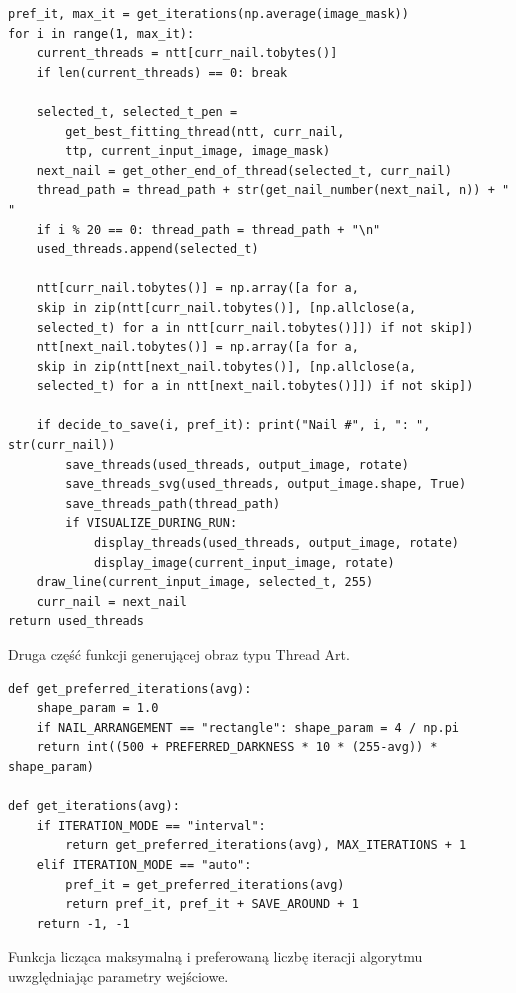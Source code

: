         \begin{code}[H]
        \begin{verbatim}
pref_it, max_it = get_iterations(np.average(image_mask))
for i in range(1, max_it):
    current_threads = ntt[curr_nail.tobytes()]
    if len(current_threads) == 0: break 

    selected_t, selected_t_pen =
        get_best_fitting_thread(ntt, curr_nail, 
        ttp, current_input_image, image_mask)
    next_nail = get_other_end_of_thread(selected_t, curr_nail)
    thread_path = thread_path + str(get_nail_number(next_nail, n)) + " "
    if i % 20 == 0: thread_path = thread_path + "\n"
    used_threads.append(selected_t)

    ntt[curr_nail.tobytes()] = np.array([a for a, 
    skip in zip(ntt[curr_nail.tobytes()], [np.allclose(a, 
    selected_t) for a in ntt[curr_nail.tobytes()]]) if not skip])
    ntt[next_nail.tobytes()] = np.array([a for a, 
    skip in zip(ntt[next_nail.tobytes()], [np.allclose(a, 
    selected_t) for a in ntt[next_nail.tobytes()]]) if not skip])
    
    if decide_to_save(i, pref_it): print("Nail #", i, ": ", str(curr_nail))
        save_threads(used_threads, output_image, rotate)
        save_threads_svg(used_threads, output_image.shape, True)
        save_threads_path(thread_path)
        if VISUALIZE_DURING_RUN:
            display_threads(used_threads, output_image, rotate)
            display_image(current_input_image, rotate)
    draw_line(current_input_image, selected_t, 255)
    curr_nail = next_nail
return used_threads
        \end{verbatim}
        \caption{Druga część funkcji generującej obraz typu Thread Art.}
        \label{imp-art-algorithm-loop-code}
        \end{code}
        

        \begin{code}[H]
        \begin{verbatim}
def get_preferred_iterations(avg):
    shape_param = 1.0
    if NAIL_ARRANGEMENT == "rectangle": shape_param = 4 / np.pi
    return int((500 + PREFERRED_DARKNESS * 10 * (255-avg)) * shape_param)

def get_iterations(avg):
    if ITERATION_MODE == "interval":
        return get_preferred_iterations(avg), MAX_ITERATIONS + 1
    elif ITERATION_MODE == "auto":
        pref_it = get_preferred_iterations(avg)
        return pref_it, pref_it + SAVE_AROUND + 1
    return -1, -1
        \end{verbatim}
        \caption{Funkcja licząca maksymalną i preferowaną liczbę iteracji algorytmu uwzględniając parametry wejściowe.}
        \label{imp-art-algorithm-iterations-code}
        \end{code}
        
